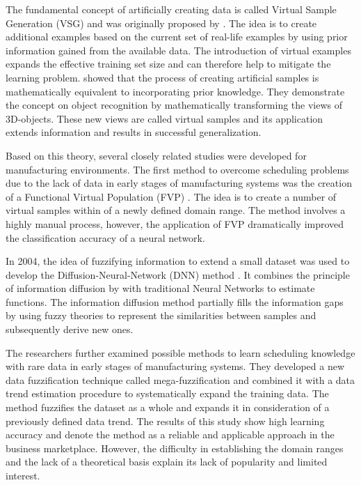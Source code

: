 \documentclass[parskip=full]{scrartcl}
\begin{document}
The fundamental concept of artificially creating data is called Virtual Sample Generation (VSG) and was 
originally proposed by \cite{Niyogi.1998}. The idea is to create additional examples based on the 
current set of real-life examples by using prior information gained from the available data. The 
introduction of virtual examples expands the effective training set size and can therefore help to 
mitigate the learning problem. \cite{Niyogi.1998} showed that the process of creating artificial samples 
is mathematically equivalent to incorporating prior knowledge. They demonstrate the concept on object 
recognition by mathematically transforming the views of 3D-objects. These new views are called virtual 
samples and its application extends information and results in successful generalization. 

Based on this theory, several closely related studies were developed for manufacturing environments. 
The first method to overcome scheduling problems due to the lack of data in early stages of 
manufacturing systems was the creation of a Functional Virtual Population (FVP) \cite{Li.2003}. The 
idea is to create a number of virtual samples within of a newly defined domain range. The method 
involves a highly manual process, however, the application of FVP dramatically improved the 
classification accuracy of a neural network. 

In 2004, the idea of fuzzifying information to extend a small dataset was used to develop the 
Diffusion-Neural-Network (DNN) method \cite{Huang.2004}. It combines the principle of information 
diffusion by \cite{Huang.1997} with  traditional Neural Networks to estimate functions. The information 
diffusion method partially fills the information gaps by using fuzzy theories to represent the similarities 
between samples and subsequently derive new ones. 

The researchers \cite{Li.2006b} further examined possible methods to learn scheduling knowledge with 
rare data in early stages of manufacturing systems. They developed a new data fuzzification technique 
called mega-fuzzification and combined it with a data trend estimation procedure to systematically 
expand the training data. The method fuzzifies the dataset as a whole and expands it in consideration of 
a previously defined data trend. The results of this study show high learning accuracy and denote the 
method as a reliable and applicable approach in the business marketplace. However, the difficulty in 
establishing the domain ranges and the lack of a theoretical basis explain its lack of popularity and 
limited interest. 
\end{document}
